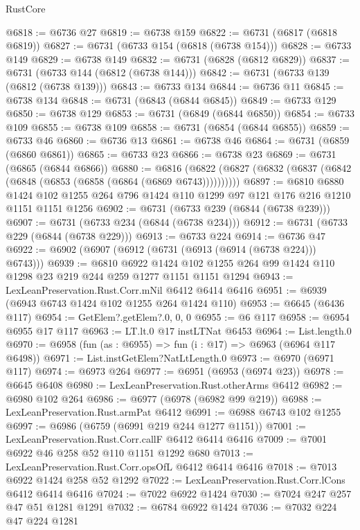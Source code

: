 \begin{lexlean}{RustCore}
\begin{coremodule}
@6818 := @6736 @27
@6819 := @6738 @159
@6822 := @6731 (@6817 (@6818 @6819))
@6827 := @6731 (@6733 @154 (@6818 (@6738 @154)))
@6828 := @6733 @149
@6829 := @6738 @149
@6832 := @6731 (@6828 (@6812 @6829))
@6837 := @6731 (@6733 @144 (@6812 (@6738 @144)))
@6842 := @6731 (@6733 @139 (@6812 (@6738 @139)))
@6843 := @6733 @134
@6844 := @6736 @11
@6845 := @6738 @134
@6848 := @6731 (@6843 (@6844 @6845))
@6849 := @6733 @129
@6850 := @6738 @129
@6853 := @6731 (@6849 (@6844 @6850))
@6854 := @6733 @109
@6855 := @6738 @109
@6858 := @6731 (@6854 (@6844 @6855))
@6859 := @6733 @46
@6860 := @6736 @13
@6861 := @6738 @46
@6864 := @6731 (@6859 (@6860 @6861))
@6865 := @6733 @23
@6866 := @6738 @23
@6869 := @6731 (@6865 (@6844 @6866))
@6880 := @6816 (@6822 (@6827 (@6832 (@6837 (@6842 (@6848 (@6853 (@6858 (@6864 (@6869 @6743))))))))))
@6897 := @6810
    @6880
    @1424
    @102
    @1255
    @264
    @796
    @1424
    @110
    @1299
    @97
    @121
    @176
    @216
    @1210
    @1151
    @1151
    @1256
@6902 := @6731 (@6733 @239 (@6844 (@6738 @239)))
@6907 := @6731 (@6733 @234 (@6844 (@6738 @234)))
@6912 := @6731 (@6733 @229 (@6844 (@6738 @229)))
@6913 := @6733 @224
@6914 := @6736 @47
@6922 := @6902 (@6907 (@6912 (@6731 (@6913 (@6914 (@6738 @224))) @6743)))
@6939 := @6810
    @6922
    @1424
    @102
    @1255
    @264
    @99
    @1424
    @110
    @1298
    @23
    @219
    @244
    @259
    @1277
    @1151
    @1151
    @1294
@6943 := LexLeanPreservation.Rust.Corr.mNil @6412 @6414 @6416
@6951 := @6939 (@6943 @6743 @1424 @102 @1255 @264 @1424 @110)
@6953 := @6645 (@6436 @117)
@6954 := GetElem?.getElem?.{0, 0, 0}
@6955 := @6 @117
@6958 := @6954 @6955 @17 @117
@6963 := LT.lt.{0} @17 instLTNat @6453
@6964 := List.length.{0}
@6970 := @6958 (fun (as : @6955) => fun (i : @17) => @6963 (@6964 @117 @6498))
@6971 := List.instGetElem?NatLtLength.{0}
@6973 := @6970 (@6971 @117)
@6974 := @6973 @264
@6977 := @6951 (@6953 (@6974 @23))
@6978 := @6645 @6408
@6980 := LexLeanPreservation.Rust.otherArms @6412
@6982 := @6980 @102 @264
@6986 := @6977 (@6978 (@6982 @99 @219))
@6988 := LexLeanPreservation.Rust.armPat @6412
@6991 := @6988 @6743 @102 @1255
@6997 := @6986 (@6759 (@6991 @219 @244 @1277 @1151))
@7001 := LexLeanPreservation.Rust.Corr.callF @6412 @6414 @6416
@7009 := @7001 @6922 @46 @258 @52 @110 @1151 @1292 @680
@7013 := LexLeanPreservation.Rust.Corr.opsOfL @6412 @6414 @6416
@7018 := @7013 @6922 @1424 @258 @52 @1292
@7022 := LexLeanPreservation.Rust.Corr.lCons @6412 @6414 @6416
@7024 := @7022 @6922 @1424
@7030 := @7024 @247 @257 @47 @51 @1281 @1291
@7032 := @6784 @6922 @1424
@7036 := @7032 @224 @47 @224 @1281

\end{coremodule}
\end{lexlean}

